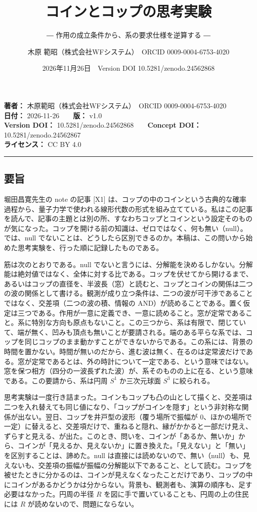 \documentclass[
  a4paper,
]{ltjsarticle}
\title{コインとコップの思考実験}
\subtitle{― 作用の成立条件から、系の要求仕様を逆算する ―}
\author{木原 範昭（株式会社WFシステム）　ORCID 0009-0004-6753-4020}
\date{2026年11月26日　Version DOI 10.5281/zenodo.24562868}
\begin{document}
\maketitle

\textbf{著者：} 木原範昭（株式会社WFシステム）　ORCID
0009-0004-6753-4020\\
\textbf{日付：} 2026-11-26　　\textbf{版：} v1.0\\
\textbf{Version DOI：} 10.5281/zenodo.24562868　　\textbf{Concept DOI：}
10.5281/zenodo.24562867\\
\textbf{ライセンス：} CC BY 4.0

\begin{center}\rule{0.5\linewidth}{0.5pt}\end{center}

\subsection{要旨}\label{ux8981ux65e8}

堀田昌寛先生の note の記事 {[}X1{]}
は、コップの中のコインという古典的な確率過程から、量子力学で使われる線形代数の形式を組み立てている。私はこの記事を読んで、記事の主題とは別の所、すなわちコップとコインという設定そのものが気になった。コップを開ける前の知識は、ゼロではなく、何も無い（null）。では、null
でないことは、どうしたら区別できるのか。本稿は、この問いから始めた思考実験を、行った順に記録したものである。

筋は次のとおりである。null
でないと言うには、分解能を決めるしかない。分解能は絶対値ではなく、全体に対する比である。コップを伏せてから開けるまで、あるいはコップの直径を、半波長（窓）と読むと、コップとコインの関係は二つの波の関係として書ける。観測が成り立つ条件は、二つの波が可干渉であることではなく、交差項（二つの波の積、情報の
AND）が読めることである。置く仮定は三つである。作用が一意に定義でき、一意に読めること。窓が定常であること。系に特別な方向も原点もないこと。この三つから、系は有限で、閉じていて、端が無く、凹みも頂点も無いことが要請される。端のある平らな系では、コップを同じコップのまま動かすことができないからである。この系には、背景の時間を置かない。時間が無いのだから、進む波は無く、在るのは定常波だけである。窓が定常であるとは、外の時計について一定である、という意味ではない。窓を保つ相方（四分の一波長ずれた波）が、系そのものの上に在る、という意味である。この要請から、系は円周
\(S^1\) か三次元球面 \(S^3\) に絞られる。

思考実験は一度行き詰まった。コインもコップも凸の山として描くと、交差項は二つを入れ替えても同じ値になり、「コップがコインを隠す」という非対称な関係が出ない。翌日、コップを井戸型の波形（覆う場所で振幅が
0、ほかの場所で一定）に替えると、交差項だけで、重ねると隠れ、縁がかかると一部だけ見え、ずらすと見える、が出た。このとき、問いを、コインが「あるか、無いか」から、コインが「見えるか、見えないか」に置き換えた。「見えない」と「無い」を区別することは、諦めた。null
は直接には読めないので、無い（null）も、見えないも、交差項の振幅が振幅の分解能以下であること、として読む。コップを被せたときに分かるのは、コインが見えなくなったことだけであり、コップの中にコインがあるかどうかは分からない。背景も、観測者も、演算の順序も、足す必要はなかった。円周の半径
\(R\) を図に手で置いていることも、円周の上の住民には \(R\)
が読めないので、問題にならない。
\end{document}

